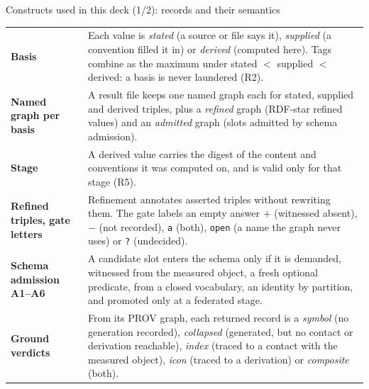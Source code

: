 \documentclass[aspectratio=169,11pt]{beamer}
\begin{document}
\begin{frame}{Constructs used in this deck (1/2): records and their semantics}
\scriptsize
\begin{tabularx}{\textwidth}{@{}L{27mm}Y@{}}
\toprule
\textbf{Basis} & Each value is \emph{stated} (a source or file says it), \emph{supplied} (a convention filled it in) or \emph{derived} (computed here). Tags combine as the maximum under stated $<$ supplied $<$ derived: a basis is never laundered (R2). \\
\textbf{Named graph per basis} & A result file keeps one named graph each for stated, supplied and derived triples, plus a \emph{refined} graph (RDF-star refined values) and an \emph{admitted} graph (slots admitted by schema admission). \\
\textbf{Stage} & A derived value carries the digest of the content and conventions it was computed on, and is valid only for that stage (R5). \\
\textbf{Refined triples, gate letters} & Refinement annotates asserted triples without rewriting them. The gate labels an empty answer $+$ (witnessed absent), $-$ (not recorded), \texttt{a} (both), \texttt{open} (a name the graph never uses) or \texttt{?} (undecided). \\
\textbf{Schema admission A1--A6} & A candidate slot enters the schema only if it is demanded, witnessed from the measured object, a fresh optional predicate, from a closed vocabulary, an identity by partition, and promoted only at a federated stage. \\
\textbf{Ground verdicts} & From its PROV graph, each returned record is a \emph{symbol} (no generation recorded), \emph{collapsed} (generated, but no contact or derivation reachable), \emph{index} (traced to a contact with the measured object), \emph{icon} (traced to a derivation) or \emph{composite} (both). \\
\bottomrule
\end{tabularx}
\end{frame}
\end{document}
